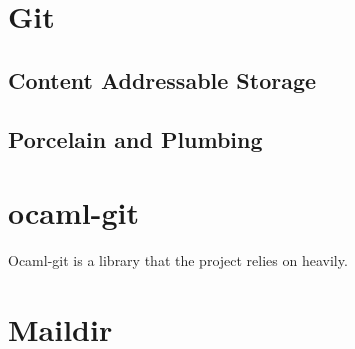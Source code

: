 \section{Git}

\subsection{Content Addressable Storage}

\subsection{Porcelain and Plumbing}

\section{ocaml-git}

Ocaml-git \cite{ocaml-git} is a library that the project relies on heavily.

\section{Maildir}
